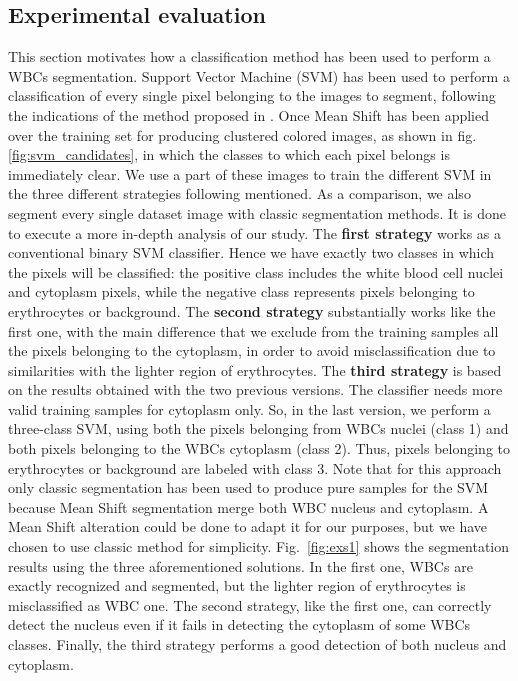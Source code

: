 {	\subsection{Experimental evaluation}
	\label{sec:experimental_evaluation}
	This section motivates how a classification method has been used to perform a WBCs segmentation. Support Vector Machine (SVM) has been used to perform a classification of every single pixel belonging to the images to segment, following the indications of the method proposed in \cite{Pan}. Once Mean Shift has been applied over the training set for producing clustered colored images, as shown in fig. \ref{fig:svm_candidates}, in which the classes to which each pixel belongs is immediately clear. We use a part of these images to train the different SVM in the three different strategies following mentioned. As a comparison, we also segment every single dataset image with classic segmentation methods. It is done to execute a more in-depth analysis of our study. The \textbf{first strategy} works as a conventional binary SVM classifier. Hence we have exactly two classes in which the pixels will be classified: the positive class includes the white blood cell nuclei and cytoplasm pixels, while the negative class represents pixels belonging to erythrocytes or background. The \textbf{second strategy} substantially works like the first one, with the main difference that we exclude from the training samples all the pixels belonging to the cytoplasm, in order to avoid misclassification due to similarities with the lighter region of erythrocytes. The \textbf{third strategy} is based on the results obtained with the two previous versions. The classifier needs more valid training samples for cytoplasm only. So, in the last version, we perform a three-class SVM, using both the pixels belonging from WBCs nuclei (class 1) and both pixels belonging to the WBCs cytoplasm (class 2). Thus, pixels belonging to erythrocytes or background are labeled with class 3. Note that for this approach only classic segmentation has been used to produce pure samples for the SVM because Mean Shift segmentation merge both WBC nucleus and cytoplasm. A Mean Shift alteration could be done to adapt it for our purposes, but we have chosen to use classic method for simplicity. Fig.~\ref{fig:exs1} shows the segmentation results using the three aforementioned solutions. In the first one, WBCs are exactly recognized and segmented, but the lighter region of erythrocytes is misclassified as WBC one. The second strategy, like the first one, can correctly detect the nucleus even if it fails in detecting the cytoplasm of some WBCs classes.  Finally, the third strategy performs a good detection of both nucleus and cytoplasm.
	
}
